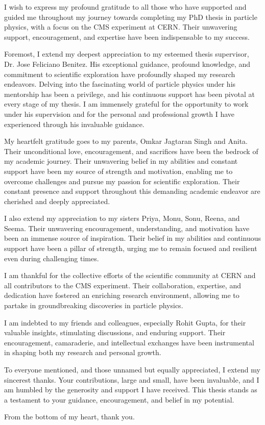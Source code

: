 I wish to express my profound gratitude to all those who have supported and guided me throughout my journey towards completing my PhD thesis in particle physics, with a focus on the CMS experiment at CERN. Their unwavering support, encouragement, and expertise have been indispensable to my success.

Foremost, I extend my deepest appreciation to my esteemed thesis supervisor, Dr. Jose Feliciano Benitez. His exceptional guidance, profound knowledge, and commitment to scientific exploration have profoundly shaped my research endeavors. Delving into the fascinating world of particle physics under his mentorship has been a privilege, and his continuous support has been pivotal at every stage of my thesis. I am immensely grateful for the opportunity to work under his supervision and for the personal and professional growth I have experienced through his invaluable guidance.

My heartfelt gratitude goes to my parents, Omkar Jagtaran Singh and Anita. Their unconditional love, encouragement, and sacrifices have been the bedrock of my academic journey. Their unwavering belief in my abilities and constant support have been my source of strength and motivation, enabling me to overcome challenges and pursue my passion for scientific exploration. Their constant presence and support throughout this demanding academic endeavor are cherished and deeply appreciated.

I also extend my appreciation to my sisters Priya, Monu, Sonu, Reena, and Seema. Their unwavering encouragement, understanding, and motivation have been an immense source of inspiration. Their belief in my abilities and continuous support have been a pillar of strength, urging me to remain focused and resilient even during challenging times.

I am thankful for the collective efforts of the scientific community at CERN and all contributors to the CMS experiment. Their collaboration, expertise, and dedication have fostered an enriching research environment, allowing me to partake in groundbreaking discoveries in particle physics.

I am indebted to my friends and colleagues, especially Rohit Gupta, for their valuable insights, stimulating discussions, and enduring support. Their encouragement, camaraderie, and intellectual exchanges have been instrumental in shaping both my research and personal growth.

To everyone mentioned, and those unnamed but equally appreciated, I extend my sincerest thanks. Your contributions, large and small, have been invaluable, and I am humbled by the generosity and support I have received. This thesis stands as a testament to your guidance, encouragement, and belief in my potential.

From the bottom of my heart, thank you.




























